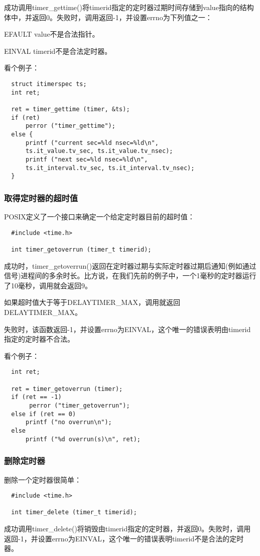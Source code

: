 成功调用timer\_gettime()将timerid指定的定时器过期时间存储到value指向的结构体中，并返回0。失败时，调用返回-1，并设置errno为下列值之一： 

\begin{eqlist*}
\item [EFAULT]
value不是合法指针。
\item [EINVAL]
timerid不是合法定时器。 
\end{eqlist*}

看个例子： 

\begin{lstlisting}
  struct itimerspec ts;
  int ret;

  ret = timer_gettime (timer, &ts);
  if (ret)
      perror ("timer_gettime");
  else {
      printf ("current sec=%ld nsec=%ld\n",
      ts.it_value.tv_sec, ts.it_value.tv_nsec);
      printf ("next sec=%ld nsec=%ld\n",
      ts.it_interval.tv_sec, ts.it_interval.tv_nsec);
  }
\end{lstlisting}


\subsubsection{取得定时器的超时值}

POSIX定义了一个接口来确定一个给定定时器目前的超时值： 

\begin{lstlisting}
  #include <time.h>

  int timer_getoverrun (timer_t timerid);
\end{lstlisting}

成功时，timer\_getoverrun()返回在定时器过期与实际定时器过期后通知(例如通过信号)进程间的多余时长。比方说，在我们先前的例子中，一个1毫秒的定时器运行了10毫秒，调用就会返回9。

如果超时值大于等于DELAYTIMER\_MAX，调用就返回DELAYTIMER\_MAX。

失败时，该函数返回-1，并设置errno为EINVAL，这个唯一的错误表明由timerid指定的定时器不合法。

看个例子： 

\begin{lstlisting}
  int ret;

  ret = timer_getoverrun (timer);
  if (ret == -1)
       perror ("timer_getoverrun");
  else if (ret == 0)
      printf ("no overrun\n");
  else
      printf ("%d overrun(s)\n", ret);
\end{lstlisting}

\subsubsection{删除定时器}

删除一个定时器很简单： 

\begin{lstlisting}
  #include <time.h>

  int timer_delete (timer_t timerid);
\end{lstlisting}

成功调用timer\_delete()将销毁由timerid指定的定时器，并返回0。失败时，调用返回-1，并设置errno为EINVAL，这个唯一的错误表明timerid不是合法的定时器。 

